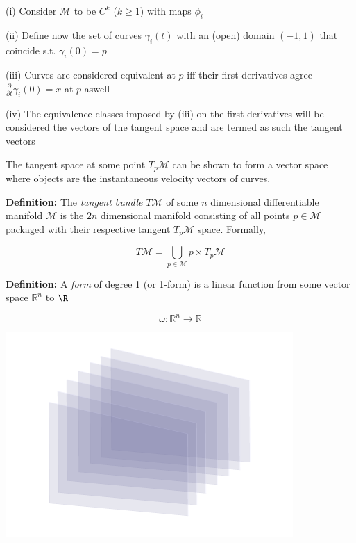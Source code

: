 \documentclass{article}\usepackage[]{graphicx}\usepackage[]{color}
\newcommand{\Rn}{\mathbb{R}^n}
\begin{document}
(i) Consider $\mathcal{M}$ to be $C^k$ ($k\geq 1$) with maps $\phi_i$

(ii) Define now the set of curves $\gamma_i(t)$ with an (open) domain $(-1,1)$ that coincide s.t. $\gamma_i(0)=p$

(iii) Curves are considered equivalent at $p$ iff their first derivatives agree $\frac{\partial }{\partial t} \gamma_i(0)=x$ at $p$ aswell

(iv) The equivalence classes imposed by (iii) on the first derivatives will be considered the vectors of the tangent space and are termed as such the tangent vectors

The tangent space at some point $T_p\mathcal{M}$ can be shown to form a vector space where objects are the instantaneous velocity vectors of curves.

\vspace{-2.5cm}

 


\textbf{Definition:} The \textit{tangent bundle} $T\mathcal{M}$ of some $n$ dimensional differentiable manifold $\mathcal{M}$ is the $2n$ dimensional manifold consisting of all points $p\in\mathcal{M}$ packaged with their respective tangent $T_p\mathcal{M}$ space. Formally,

$$
T\mathcal{M}=\bigcup_{p\in\mathcal{M}}p\times T_p\mathcal{M}
$$

\vspace{1cm}

\textbf{Definition:} A \textit{form} of degree 1 (or 1-form) is a linear function from some vector space $\Rn$ to $\R$

\vspace{-.18cm}

$$\omega:\mathbb{R}^n\rightarrow\mathbb{R}$$

\begin{center}
\includegraphics[scale=1]{1form.pdf}
\end{center}
\end{document}

